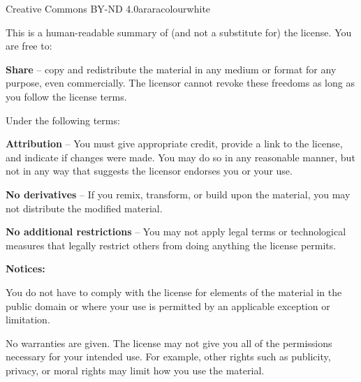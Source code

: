 \begin{messagebox}{Creative Commons BY-ND 4.0}{araracolour}{\icinfo}{white}
\setlength{\parskip}{1em}

This is a human-readable summary of (and not a substitute for) the license. You are free to:

\textbf{Share} -- copy and redistribute the material in any medium or format for any purpose, even commercially. The licensor cannot revoke these freedoms as long as you follow the license terms.

Under the following terms:

\textbf{Attribution} -- You must give appropriate credit, provide a link to the license, and indicate if changes were made. You may do so in any reasonable manner, but not in any way that suggests the licensor endorses you or your use.

\textbf{No derivatives} -- If you remix, transform, or build upon the material, you may not distribute the modified material.

\textbf{No additional restrictions} -- You may not apply legal terms or technological measures that legally restrict others from doing anything the license permits.

\textbf{Notices:}

You do not have to comply with the license for elements of the material in the public domain or where your use is permitted by an applicable exception or limitation.

No warranties are given. The license may not give you all of the permissions necessary for your intended use. For example, other rights such as publicity, privacy, or moral rights may limit how you use the material.

{\centering\color{araracolour}\scalebox{2.0}{\ccbynd}\par} 
\end{messagebox}

